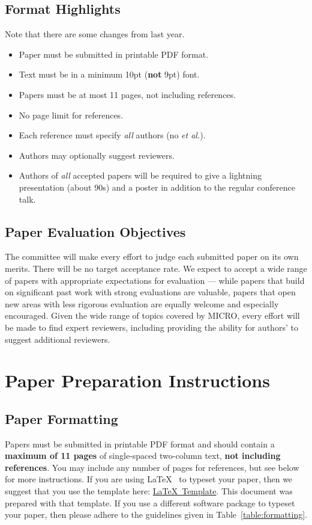 \documentclass{sig-alternate}
\begin{document}
\subsection{Format Highlights}
 Note that there are some changes from last year. 
\begin{itemize} 
\item Paper must be submitted in printable PDF format.
\item Text must be in a minimum 10pt ({\bf not} 9pt) font.
\item Papers must be at most 11 pages, not including references. 
\item No page limit for references. 
\item Each reference must specify {\em all} authors (no {\em et al.}). 
\item Authors may optionally suggest reviewers. 
\item Authors of {\em all} accepted papers will be required to give a
lightning presentation (about 90s) and a poster in addition to the regular
conference talk.
\end{itemize} 

\subsection{Paper Evaluation Objectives} 
The committee will make every effort to judge each submitted paper on 
its own merits. There will be no target acceptance rate. 
We expect to accept a wide range of papers with appropriate expectations 
for evaluation --- while papers that build on significant past work 
with strong evaluations are valuable, papers that open new areas with 
less rigorous evaluation are equally welcome and especially encouraged. 
Given the wide range of topics covered by MICRO, every effort will be 
made to find expert reviewers, including providing the ability for authors' 
to suggest additional reviewers. 

\section{Paper Preparation Instructions}

\subsection{Paper Formatting}

Papers must be submitted in printable PDF format and should contain a
{\bf maximum of 11 pages} of single-spaced two-column text, {\bf not
  including references}.  You may include any number of pages for
references, but see below for more instructions.  If you are using
\LaTeX~\cite{lamport94} to typeset your paper, then we suggest that
you use the template here:
\href{http://www.microarch.org/micro48/micro48-latex-template.tar.gz}{\LaTeX~Template}. This
document was prepared with that template.  If you use a different
software package to typeset your paper, then please adhere to the
guidelines given in Table~\ref{table:formatting}.
\end{document}
